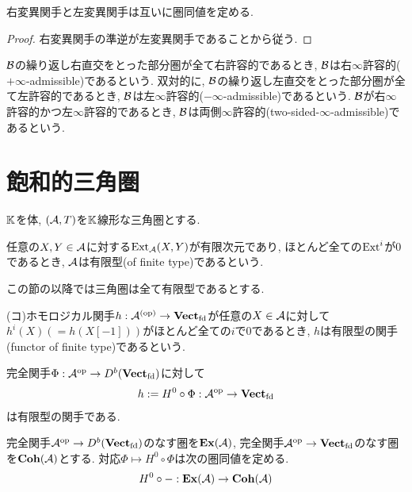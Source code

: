 \documentclass[uplatex, a4paper, 14Q, dvipdfmx]{jsarticle}
\begin{document}
\begin{lemma}
  右変異関手と左変異関手は互いに圏同値を定める. 
\end{lemma}

\begin{proof}
  右変異関手の準逆が左変異関手であることから従う. 
\end{proof}

\begin{definition}
  $\mathcal{B}$の繰り返し右直交をとった部分圏が全て右許容的であるとき, $\mathcal{B}$は右$\infty$許容的($+\infty$-admissible)であるという. 
  双対的に, $\mathcal{B}$の繰り返し左直交をとった部分圏が全て左許容的であるとき, $\mathcal{B}$は左$\infty$許容的($-\infty$-admissible)であるという. 
  $\mathcal{B}$が右$\infty$許容的かつ左$\infty$許容的であるとき, $\mathcal{B}$は両側$\infty$許容的(two-sided-$\infty$-admissible)であるという.
\end{definition}

\section{飽和的三角圏}

$\mathbb{K}$を体, $(\mathcal{A},T)$を$\mathbb{K}$線形な三角圏とする.

\begin{definition}[有限型]
  任意の$X,Y \in \mathcal{A}$に対する$\mathrm{Ext}_{\mathcal{A}}(X,Y)$が有限次元であり, ほとんど全ての$\mathrm{Ext}^i$が$0$であるとき, $\mathcal{A}$は有限型(of finite type)であるという.
\end{definition}

この節の以降では三角圏は全て有限型であるとする. 

\begin{definition}[有限型の関手]
  (コ)ホモロジカル関手$h : \mathcal{A}^{(\mathrm{op})} \to \mathbf{Vect}_{\mathrm{fd}}$が任意の$X \in \mathcal{A}$に対して$h^i(X) (= h(X[-1]))$がほとんど全ての$i$で$0$であるとき, $h$は有限型の関手(functor of finite type)であるという. 
\end{definition}

\begin{example}
  完全関手$\Phi : \mathcal{A}^{\mathrm{op}} \to D^b(\mathbf{Vect}_{\mathrm{fd}})$に対して
  \begin{align*}
    h := H^0 \circ \Phi : \mathcal{A}^{\mathrm{op}} \to \mathbf{Vect}_{\mathrm{fd}}
  \end{align*}
  は有限型の関手である.
\end{example}

\begin{lemma}
  完全関手$\mathcal{A}^{\mathrm{op}} \to D^b(\mathbf{Vect}_{\mathrm{fd}})$のなす圏を$\mathbf{Ex}(\mathcal{A})$, 完全関手$\mathcal{A}^{\mathrm{op}} \to \mathbf{Vect}_{\mathrm{fd}}$のなす圏を$\mathbf{Coh}(\mathcal{A})$とする. 
  対応$\Phi \mapsto H^0 \circ \Phi$は次の圏同値を定める. 
  \begin{align*}
    H^0 \circ - : \mathbf{Ex}(\mathcal{A}) \to \mathbf{Coh}(\mathcal{A})
  \end{align*}
\end{lemma}
\end{document}
